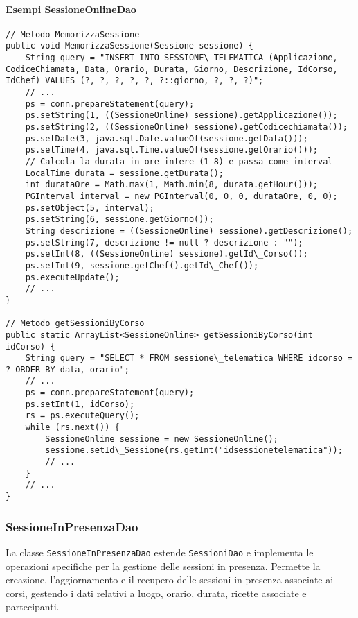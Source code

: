\paragraph{Esempi SessioneOnlineDao}
\begin{verbatim}
// Metodo MemorizzaSessione
public void MemorizzaSessione(Sessione sessione) {
    String query = "INSERT INTO SESSIONE\_TELEMATICA (Applicazione, CodiceChiamata, Data, Orario, Durata, Giorno, Descrizione, IdCorso, IdChef) VALUES (?, ?, ?, ?, ?, ?::giorno, ?, ?, ?)";
    // ...
    ps = conn.prepareStatement(query);
    ps.setString(1, ((SessioneOnline) sessione).getApplicazione());
    ps.setString(2, ((SessioneOnline) sessione).getCodicechiamata());
    ps.setDate(3, java.sql.Date.valueOf(sessione.getData()));
    ps.setTime(4, java.sql.Time.valueOf(sessione.getOrario()));
    // Calcola la durata in ore intere (1-8) e passa come interval
    LocalTime durata = sessione.getDurata();
    int durataOre = Math.max(1, Math.min(8, durata.getHour()));
    PGInterval interval = new PGInterval(0, 0, 0, durataOre, 0, 0);
    ps.setObject(5, interval);
    ps.setString(6, sessione.getGiorno());
    String descrizione = ((SessioneOnline) sessione).getDescrizione();
    ps.setString(7, descrizione != null ? descrizione : "");
    ps.setInt(8, ((SessioneOnline) sessione).getId\_Corso());
    ps.setInt(9, sessione.getChef().getId\_Chef());
    ps.executeUpdate();
    // ...
}

// Metodo getSessioniByCorso
public static ArrayList<SessioneOnline> getSessioniByCorso(int idCorso) {
    String query = "SELECT * FROM sessione\_telematica WHERE idcorso = ? ORDER BY data, orario";
    // ...
    ps = conn.prepareStatement(query);
    ps.setInt(1, idCorso);
    rs = ps.executeQuery();
    while (rs.next()) {
        SessioneOnline sessione = new SessioneOnline();
        sessione.setId\_Sessione(rs.getInt("idsessionetelematica"));
        // ...
    }
    // ...
}
\end{verbatim}

\subsubsection{SessioneInPresenzaDao}
La classe \texttt{SessioneInPresenzaDao} estende \texttt{SessioniDao} e implementa le operazioni specifiche per la gestione delle sessioni in presenza. Permette la creazione, l'aggiornamento e il recupero delle sessioni in presenza associate ai corsi, gestendo i dati relativi a luogo, orario, durata, ricette associate e partecipanti.

